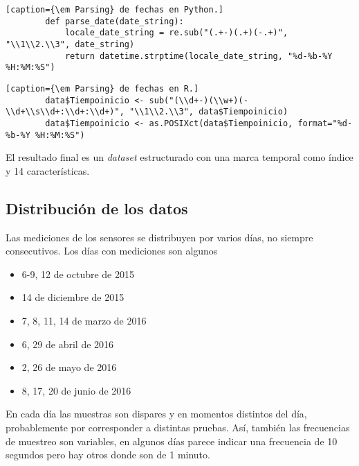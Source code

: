 \documentclass[11pt,spanish,listoffigures,listoftables]{tfgetsinf}
\begin{document}
        \lstset{style=python}
        \begin{lstlisting}[caption={\em Parsing} de fechas en Python.]
        def parse_date(date_string):
            locale_date_string = re.sub("(.+-)(.+)(-.+)", "\\1\\2.\\3", date_string)
            return datetime.strptime(locale_date_string, "%d-%b-%Y %H:%M:%S")
        \end{lstlisting}
        
        \begin{lstlisting}[caption={\em Parsing} de fechas en R.]
        data$Tiempoinicio <- sub("(\\d+-)(\\w+)(-\\d+\\s\\d+:\\d+:\\d+)", "\\1\\2.\\3", data$Tiempoinicio)
        data$Tiempoinicio <- as.POSIXct(data$Tiempoinicio, format="%d-%b-%Y %H:%M:%S")
        \end{lstlisting}
        
        El resultado final es un {\em dataset} estructurado con una marca temporal como índice y 14 características.
        
        \subsection{Distribución de los datos}
        
        Las mediciones de los sensores se distribuyen por varios días, no siempre consecutivos. Los días con mediciones son algunos 
        \begin{itemize}
        \item 6-9, 12 de octubre de 2015
        \item 14 de diciembre de 2015
        \item 7, 8, 11, 14 de marzo de 2016
        \item 6, 29 de abril de 2016
        \item 2, 26 de mayo de 2016
        \item 8, 17, 20 de junio de 2016
        \end{itemize}
        
        En cada día las muestras son dispares y en momentos distintos del día, probablemente por corresponder a distintas pruebas. Así, también las frecuencias de muestreo son variables, en algunos días parece indicar una frecuencia de 10 segundos pero hay otros donde son de 1 minuto.
    
\end{document}
